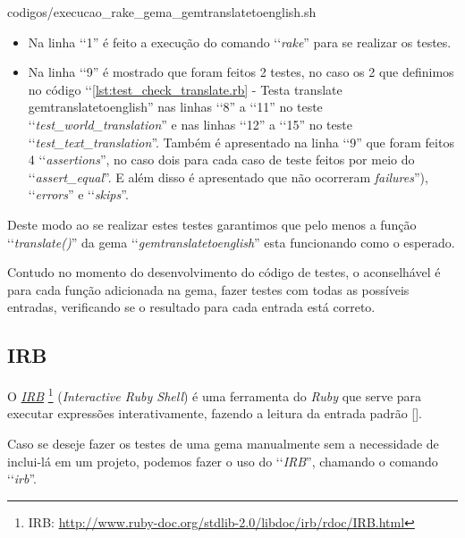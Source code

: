 
{codigos/execucao_rake_gema_gemtranslatetoenglish.sh }

\begin{itemize}

 \item Na linha ‘‘1'' é feito a execução do comando ‘‘\emph{rake}'' para se realizar os testes.
 
 \item Na linha ‘‘9'' é mostrado que foram feitos 2 testes, no caso os 2 que definimos no código 
 ‘‘\ref{lst:test_check_translate.rb} - Testa translate gemtranslatetoenglish'' nas linhas 
 ‘‘8'' a ‘‘11'' no teste ‘‘\emph{test\_world\_translation}'' e nas linhas ‘‘12'' a ‘‘15'' no teste 
 ‘‘\emph{test\_text\_translation}''. Também é apresentado na linha ‘‘9'' que foram feitos 4 
 ‘‘\emph{assertions}'', no caso dois para cada caso de teste feitos por meio do ‘‘\emph{assert\_equal}''.
 E além disso é apresentado que não ocorreram  \emph{failures}''), ‘‘\emph{errors}'' e ‘‘\emph{skips}''.
 
\end{itemize}

Deste modo ao se realizar estes testes garantimos que pelo menos a função ‘‘\emph{translate()}'' da gema
‘‘\emph{gemtranslatetoenglish}'' esta funcionando como o esperado.

Contudo no momento do desenvolvimento do código de testes, o aconselhável é para cada função adicionada 
na gema, fazer testes com todas as possíveis entradas, verificando se o resultado para cada entrada 
está correto.

\subsection{IRB}
\label{subsection:irb}

O \emph{\href{http://www.ruby-doc.org/stdlib-2.0/libdoc/irb/rdoc/IRB.html}{IRB}} 
\footnote{IRB: \url{http://www.ruby-doc.org/stdlib-2.0/libdoc/irb/rdoc/IRB.html}}
(\emph{Interactive Ruby Shell}) é uma ferramenta do \emph{Ruby} que serve para executar expressões
interativamente, fazendo a leitura da entrada padrão [].

Caso se deseje fazer os testes de uma gema manualmente sem a necessidade de inclui-lá em um projeto, podemos
fazer o uso do ‘‘\emph{IRB}'', chamando o comando ‘‘\emph{irb}''.

